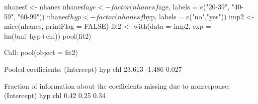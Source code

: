 \begin{Schunk}
\begin{Sinput}
 nhanesf <- nhanes
 nhanesf$age <- factor(nhanesf$age, labels = c("20-39", "40-59", "60-99"))
 nhanesf$hyp <- factor(nhanesf$hyp, labels = c("no","yes"))
 imp2 <- mice(nhanes, printFlag = FALSE) 
 fit2 <- with(data = imp2, exp = lm(bmi~hyp+chl))
 pool(fit2)
\end{Sinput}
\begin{Soutput}
Call: pool(object = fit2)

Pooled coefficients:
(Intercept)         hyp         chl 
     23.613      -1.486       0.027 

Fraction of information about the coefficients missing due to nonresponse: 
(Intercept)         hyp         chl 
       0.42        0.25        0.34 
\end{Soutput}
\end{Schunk}
